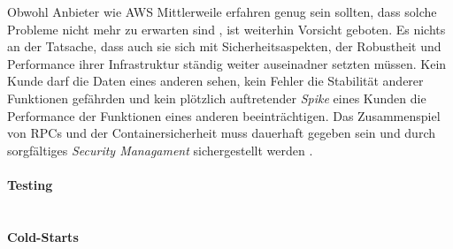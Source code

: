 \documentclass[11pt]{article}
\begin{document}
Obwohl Anbieter wie AWS Mittlerweile erfahren genug sein sollten, dass solche Probleme nicht mehr zu erwarten sind \cite{fowler2018serverless}, ist weiterhin Vorsicht geboten. Es nichts an der Tatsache, dass auch sie sich mit Sicherheitsaspekten, der Robustheit und Performance ihrer Infrastruktur ständig weiter auseinadner setzten müssen. Kein Kunde darf die Daten eines anderen sehen, kein Fehler die Stabilität anderer Funktionen gefährden und kein plötzlich auftretender \textit{Spike} eines Kunden die Performance der Funktionen eines anderen beeinträchtigen. Das Zusammenspiel von RPCs und der Containersicherheit muss dauerhaft gegeben sein und durch sorgfältiges \textit{Security Managament} sichergestellt werden \cite{mcgrath2017serverless}. \\\\
\textbf{Testing}\\
\\\\
\textbf{Cold-Starts}\\
\end{document}
